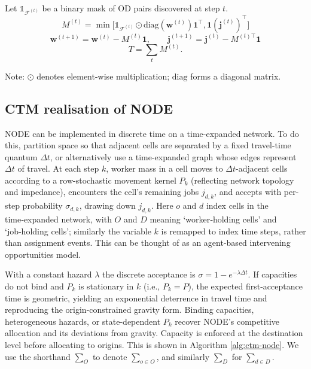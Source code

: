 Let $\mathbb{1}_{\mathcal{F}^{(t)}}$ be a binary mask of OD pairs discovered at step $t$.
\begin{equation}
M^{(t)} = \min\!\big[ \mathbb{1}_{\mathcal{F}^{(t)}} \odot \mathrm{diag}(\mathbf{w}^{(t)})\mathbf{1}^\top, \mathbf{1}(\mathbf{j}^{(t)})^\top \big]
\end{equation}
\begin{equation}
\mathbf{w}^{(t+1)} = \mathbf{w}^{(t)} - M^{(t)}\mathbf{1}, \qquad
\mathbf{j}^{(t+1)} = \mathbf{j}^{(t)} - M^{(t)\top}\mathbf{1}
\end{equation}
\begin{equation}
T = \sum_t M^{(t)}.
\end{equation}

Note: $\odot$ denotes element-wise multiplication; $\mathrm{diag}$  forms a diagonal matrix.

\subsection{CTM realisation of NODE}

NODE can be implemented in discrete time on a time-expanded network. To do this, partition space so that adjacent cells are separated by a fixed travel-time quantum $\Delta t$, or alternatively use a time-expanded graph whose edges represent $\Delta t$ of travel. At each step $k$, worker mass in a cell moves to $\Delta t$-adjacent cells according to a row-stochastic movement kernel $P_k$ (reflecting network topology and impedance), encounters the cell’s remaining jobs $j_{d,k}$, and accepts with per-step probability $\sigma_{d,k}$, drawing down $j_{d,k}$. Here $o$ and $d$ index cells in the time‑expanded network, with $O$ and $D$ meaning `worker‑holding cells' and `job‑holding cells'; similarly the variable $k$ is remapped to index time steps, rather than assignment events. This can be thought of as an agent-based intervening opportunities model.


With a constant hazard $\lambda$ the discrete acceptance is $\sigma = 1 - e^{-\lambda \Delta t}$. If capacities do not bind and $P_k$ is stationary in $k$ (i.e., $P_k = P$), the expected first-acceptance time is geometric, yielding an exponential deterrence in travel time and reproducing the origin-constrained gravity form. Binding capacities, heterogeneous hazards, or state-dependent $P_k$ recover NODE’s competitive allocation and its deviations from gravity. Capacity is enforced at the destination level before allocating to origins. This is shown in Algorithm \ref{alg:ctm-node}. We use the shorthand $\sum_O$ to denote $\sum_{o\in O}$, and similarly $\sum_D$ for $\sum_{d\in D}$. 



